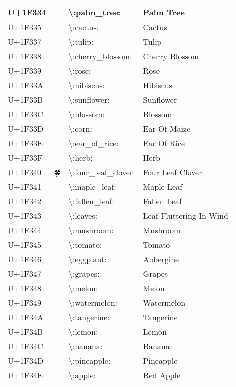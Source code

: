 \begin{table}[h]
\begin{tabulary}{\linewidth}{|L|L|L|L|}
\hline
U+1F334 & 🌴 & {\textbackslash}:palm\_tree: & Palm Tree \\
\hline
U+1F335 & 🌵 & {\textbackslash}:cactus: & Cactus \\
\hline
U+1F337 & 🌷 & {\textbackslash}:tulip: & Tulip \\
\hline
U+1F338 & 🌸 & {\textbackslash}:cherry\_blossom: & Cherry Blossom \\
\hline
U+1F339 & 🌹 & {\textbackslash}:rose: & Rose \\
\hline
U+1F33A & 🌺 & {\textbackslash}:hibiscus: & Hibiscus \\
\hline
U+1F33B & 🌻 & {\textbackslash}:sunflower: & Sunflower \\
\hline
U+1F33C & 🌼 & {\textbackslash}:blossom: & Blossom \\
\hline
U+1F33D & 🌽 & {\textbackslash}:corn: & Ear Of Maize \\
\hline
U+1F33E & 🌾 & {\textbackslash}:ear\_of\_rice: & Ear Of Rice \\
\hline
U+1F33F & 🌿 & {\textbackslash}:herb: & Herb \\
\hline
U+1F340 & 🍀 & {\textbackslash}:four\_leaf\_clover: & Four Leaf Clover \\
\hline
U+1F341 & 🍁 & {\textbackslash}:maple\_leaf: & Maple Leaf \\
\hline
U+1F342 & 🍂 & {\textbackslash}:fallen\_leaf: & Fallen Leaf \\
\hline
U+1F343 & 🍃 & {\textbackslash}:leaves: & Leaf Fluttering In Wind \\
\hline
U+1F344 & 🍄 & {\textbackslash}:mushroom: & Mushroom \\
\hline
U+1F345 & 🍅 & {\textbackslash}:tomato: & Tomato \\
\hline
U+1F346 & 🍆 & {\textbackslash}:eggplant: & Aubergine \\
\hline
U+1F347 & 🍇 & {\textbackslash}:grapes: & Grapes \\
\hline
U+1F348 & 🍈 & {\textbackslash}:melon: & Melon \\
\hline
U+1F349 & 🍉 & {\textbackslash}:watermelon: & Watermelon \\
\hline
U+1F34A & 🍊 & {\textbackslash}:tangerine: & Tangerine \\
\hline
U+1F34B & 🍋 & {\textbackslash}:lemon: & Lemon \\
\hline
U+1F34C & 🍌 & {\textbackslash}:banana: & Banana \\
\hline
U+1F34D & 🍍 & {\textbackslash}:pineapple: & Pineapple \\
\hline
U+1F34E & 🍎 & {\textbackslash}:apple: & Red Apple \\

\end{tabulary}
\end{table}
